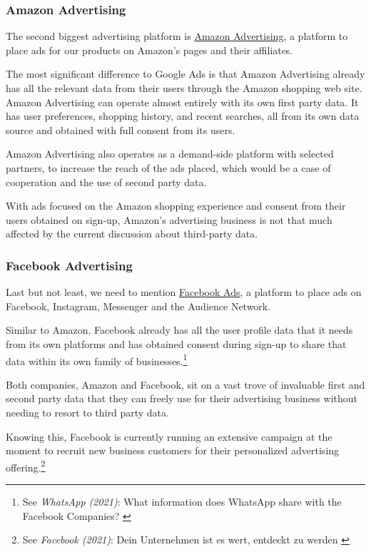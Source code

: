 \subsubsection{Amazon Advertising}

The second biggest advertising platform is \href{https://advertising.amazon.com//}{Amazon Advertising}, a platform to place ads for our products on Amazon's pages and their affiliates.

The most significant difference to Google Ads is that Amazon Advertising already has all the relevant data from their users through the Amazon shopping web site. Amazon Advertising can operate almost entirely with its own first party data. It has user preferences, shopping history, and recent searches, all from its own data source and obtained with full consent from its users.

Amazon Advertising also operates as a demand-side platform with selected partners, to increase the reach of the ads placed, which would be a case of cooperation and the use of second party data.

With ads focused on the Amazon shopping experience and consent from their users obtained on sign-up, Amazon's advertising business is not that much affected by the current discussion about third-party data.

\subsubsection{Facebook Advertising}

Last but not least, we need to mention \href{https://www.facebook.com/business/ads}{Facebook Ads}, a platform to place ads on Facebook, Instagram, Messenger and the Audience Network.

Similar to Amazon, Facebook already has all the user profile data that it needs from its own platforms and has obtained consent during sign-up to share that data within its own family of businesses.\footnote{See \textit{WhatsApp (2021)}: What information does WhatsApp share with the Facebook Companies? \cite{whatsApp}}

Both companies, Amazon and Facebook, sit on a vast trove of invaluable first and second party data that they can freely use for their advertising business without needing to resort to third party data.

Knowing this, Facebook is currently running an extensive campaign at the moment to recruit new business customers for their personalized advertising offering.\footnote{See \textit{Facebook (2021)}: Dein Unternehmen ist es wert, entdeckt zu werden \cite{facebookAds}}

